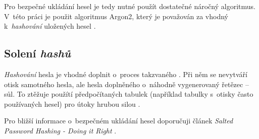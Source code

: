 Pro bezpečné ukládání hesel je tedy nutné použít dostatečné náročný algoritmus. V~této práci je použit algoritmus Argon2, který je považován za vhodný k~\textit{hashování} uložených hesel \cite{hash_crackstation}.

\subsection{Solení \textit{hashů}}

\textit{Hashování} hesla je vhodné doplnit o~proces takzvaného . Při něm se nevytváří otisk samotného hesla, ale hesla doplněného o~náhodně vygenerovaný řetězec -- sůl. To ztěžuje použítí předpočítaných tabulek (například tabulky s~otisky často používaných hesel) pro útoky hrubou silou \cite{hash_crackstation}.

Pro bližší informace o~bezpečném ukládání hesel doporučuji článek \textit{Salted Password Hashing - Doing it Right} \cite{hash_crackstation}.
